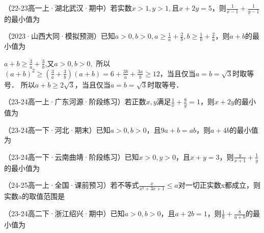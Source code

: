 \documentclass[11pt,a4paper]{ctexbook}
\begin{document}
\begin{hmwk}
    （22-23高一上·湖北武汉·期中）若实数$x>1,y>1,$且$x+2y=5$，则$\displaystyle \frac{1}{x-1}+\frac{1}{y-1}$的最小值为
\end{hmwk}

\begin{hmwk}
    （2023·山西大同·模拟预测）已知$\displaystyle a>0,b>0,a\ge \frac{1}{a}+\frac{2}{b},b \ge \frac{1}{b}+\frac{2}{a}$，则$a+b$的最小值为
    \begin{jiexi}
    $\displaystyle a+b \ge \frac{3}{a}+\frac{3}{b}$,又$a>0,b>0,$
    所以$\displaystyle (a+b)^2 \ge (\frac{3}{a}+\frac{3}{b})(a+b)=6+\frac{3b}{a}+\frac{3a}{b}\ge 12$，当且仅当$a=b=\sqrt{3}$时取等号．
    所以$a+b\ge2\sqrt{3}$，当且仅当$a=b=\sqrt{3}$时取等号．
    \end{jiexi}
\end{hmwk}

\begin{hmwk}
    （23-24高一上·广东河源·阶段练习）若正数$x,y$满足$\displaystyle \frac{1}{x}+\frac{8}{y}=1$，则$x+2y$的最小值为
\end{hmwk}

\begin{hmwk}
    （23-24高一下·河北·期末）已知$a>0,b>0$，且$9a+b=ab$，则$a+4b$的最小值为
\end{hmwk}

\begin{hmwk}
    （23-24高一下·云南曲靖·阶段练习）已知$x>0,y>0$，且$x+y=3$，则$\displaystyle \frac{y}{x+1}+\frac{1}{y}$的最小值为
\end{hmwk}

\begin{hmwk}
    （24-25高一上·全国·课前预习）若不等式$\displaystyle \frac{x}{x^2+3x+1}\le a$对一切正实数x都成立，则实数a的取值范围是\tiankong{$[\frac{1}{5},+\infty)$}
\end{hmwk}

\begin{hmwk}
    （23-24高二下·浙江绍兴·期中）已知$a>0,b>0$，且$a+2b=1$，则$\displaystyle \frac{1}{b}+\frac{8}{a+b}$的最小值为
\end{hmwk}
\end{document}
